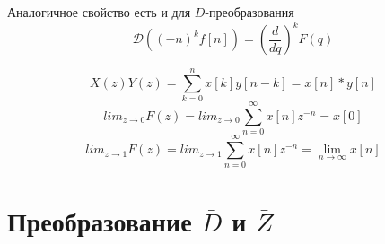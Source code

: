 \documentclass[12pt,twoside]{report}
\theoremstyle{MyNonumberplain}
\begin{document}
            Аналогичное свойство есть и для $D$-преобразования
                $$ \mathcal{D}\left((-n)^kf[n]\right) = \left(\frac{d}{dq}\right)^k F(q)$$
    
                $$ X(z)Y(z)=\sum_{k=0}^n x[k]y[n-k]= x[n] \ast y[n]$$
                $$ lim_{z \to 0} F(z)= lim_{z \to 0}\sum_{n=0}^{\infty}x[n]z^{-n}=x[0]$$
                $$ lim_{z \to 1} F(z)= lim_{z \to 1}\sum_{n=0}^{\infty}x[n]z^{-n}=\lim_{n \to \infty}x[n]$$
             
    

    \chapter{Преобразование $\bar{D}$ и $\bar{Z}$}


     

\end{document}
